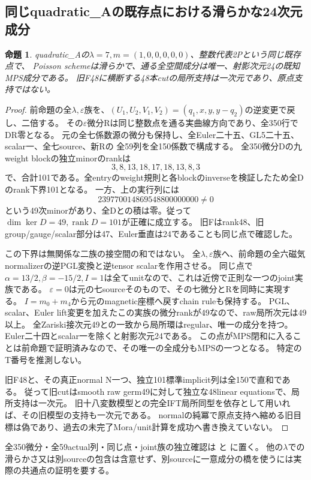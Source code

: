 \documentclass[a4paper,11pt]{ltjsarticle}
\newtheorem{proposition}{命題}[section]
\theoremstyle{definition}
\newcommand{\rank}{\operatorname{rank}}
\begin{document}
\subsection{同じquadratic\_Aの既存点における滑らかな24次元成分}
\begin{proposition}\label{prop:quadraticA-smooth-anchor}
quadratic\_Aの$\lambda=7,m=(1,0,0,0,0,0)$、整数代表2Pという同じ既存点で、
Poisson schemeは滑らかで、通る全空間成分は唯一、射影次元24の既知MPS成分である。
旧F48に横断する48本cutの局所支持は一次元であり、原点支持ではない。
\end{proposition}
\begin{proof}
前命題の全$\lambda,\varepsilon$族を、$(U_1,U_2,V_1,V_2)=(q_1,x,y,y-q_2)$の逆変更で戻し、二倍する。
その$\varepsilon$微分Rは同じ整数点を通る実曲線方向であり、全350行でDR零となる。
元の全七係数源の微分も保持し、全Euler二十五、GL5二十五、scalar一、全七source、新Rの
全59列を全150係数で構成する。
全350微分Dの九weight blockの独立minorのrankは
\[
 3,8,13,18,17,18,13,8,3
\]
で、合計101である。全entryのweight規則と各blockのinverseを検証したため全Dのrank下界101となる。
一方、上の実行列には
\[
 239770014869548800000000\ne0
\]
という49次minorがあり、全Dとの積は零。従って$\dim\ker D=49,\rank D=101$が正確に成立する。
旧Fはrank48、旧group/gauge/scalar部分は47、Euler垂直は24であることも同じ点で確認した。

この下界は無関係な二族の接空間の和ではない。
全$\lambda,\varepsilon$族へ、前命題の全六磁気normalizerの逆PGL変換と逆tensor scalarを作用させる。
同じ点で$\alpha=13/2,\beta=-15/2,I=1$は全てunitなので、これは近傍で正則な一つのjoint実族である。
$\varepsilon=0$は元の七sourceそのもので、その七微分とRを同時に実現する。
$I=m_0+m_4$から元のmagnetic座標へ戻すchain ruleも保持する。
PGL、scalar、Euler lift変更を加えたこの実族の微分rankが49なので、raw局所次元は49以上。
全Zariski接次元49との一致から局所環はregular、唯一の成分を持つ。
Euler二十四とscalar一を除くと射影次元24である。
この点がMPS閉和に入ることは前命題で証明済みなので、その唯一の全成分もMPSの一つとなる。
特定のT番号を推測しない。

旧F48と、その真正normal N一つ、独立101標準implicit列は全150で直和である。
従って旧cutはsmooth raw germ49に対して独立な48linear equationsで、局所支持は一次元。
旧十八変数模型との完全IFT局所同型を依存として用いれば、その旧模型の支持も一次元である。
normalの純冪で原点支持へ縮める旧目標は偽であり、過去の未完了Mora/unit計算を成功へ書き換えていない。
\end{proof}
全350微分・全59actual列・同じ点・joint族の独立確認は
と
に置く。
他の$\lambda$での滑らかさ又は別sourceの包含は含意せず、別sourceに一意成分の橋を使うには実際の共通点の証明を要する。
\end{document}
